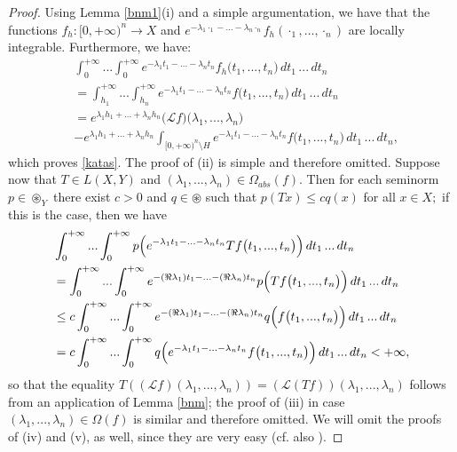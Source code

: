 \documentclass{amsart}
\theoremstyle{definition}
\theoremstyle{remark}
\numberwithin{equation}{section}
\begin{document}
\begin{proof}
Using Lemma \ref{bnm1}(i) and a simple argumentation, we have that the functions $f_{h} : [0,+\infty)^{n}\rightarrow X$ and $e^{-\lambda_{1}\cdot_{1}-...-\lambda_{n}\cdot_{n}}f_{h}(\cdot_{1},...,\cdot_{n})$ are locally integrable. Furthermore, we have:
\begin{align*} &
\int^{+\infty}_{0}...\int^{+\infty}_{0}e^{-\lambda_{1}t_{1}-...-\lambda_{n}t_{n}}f_{h}\bigl(t_{1},...,t_{n}\bigr)\, dt_{1}\, ...\, dt_{n}
\\&=\int^{+\infty}_{h_{1}}...\int^{+\infty}_{h_{n}}e^{-\lambda_{1}t_{1}-...-\lambda_{n}t_{n}}f\bigl(t_{1},...,t_{n}\bigr)\, dt_{1}\, ...\, dt_{n}
\\& =e^{\lambda_{1}h_{1}+...+\lambda_{n}h_{n}}\bigl({\mathcal Lf}\bigr)\bigl(\lambda_{1},...,\lambda_{n}\bigr)\\&-e^{\lambda_{1}h_{1}+...+\lambda_{n}h_{n}}\int_{[0,+\infty)^{n}\setminus H}e^{-\lambda_{1}t_{1}-...-\lambda_{n}t_{n}}f\bigl(t_{1},...,t_{n}\bigr)\, dt_{1}\, ...\, dt_{n},
\end{align*}
which proves \eqref{katas}. The proof of (ii) is simple and therefore omitted. Suppose now that $T\in L(X,Y)$ and $(\lambda_{1},...,\lambda_{n})\in \Omega_{abs}(f)$. Then for each seminorm $p\in \circledast_{Y}$ there exist $c>0$ and $q\in \circledast$ such that $p(Tx)\leq cq(x)$ for all $x\in X;$ if this is the case, then we have
\begin{align*} &
\int^{+\infty}_{0}...\int^{+\infty}_{0}p\Bigl(e^{-\lambda_{1}t_{1}-...-\lambda_{n}t_{n}}Tf\bigl(t_{1},...,t_{n}\bigr)\Bigr)\, dt_{1}\, ...\, dt_{n}
\\& =\int^{+\infty}_{0}...\int^{+\infty}_{0}e^{-(\Re \lambda_{1})t_{1}-...-(\Re\lambda_{n})t_{n}}p\Bigl( Tf\bigl(t_{1},...,t_{n}\bigr)\Bigr)\, dt_{1}\, ...\, dt_{n}
\\& \leq c\int^{+\infty}_{0}...\int^{+\infty}_{0}e^{-(\Re \lambda_{1})t_{1}-...-(\Re\lambda_{n})t_{n}}q\Bigl( f\bigl(t_{1},...,t_{n}\bigr)\Bigr)\, dt_{1}\, ...\, dt_{n}
\\& =c \int^{+\infty}_{0}...\int^{+\infty}_{0}q\Bigl(e^{-\lambda_{1}t_{1}-...-\lambda_{n}t_{n}}f\bigl(t_{1},...,t_{n}\bigr)\Bigr)\, dt_{1}\, ...\, dt_{n}<+\infty,
\end{align*}
so that the equality $T(({\mathcal Lf})(\lambda_{1},...,\lambda_{n}))=({\mathcal L(Tf)})(\lambda_{1},...,\lambda_{n})$ follows from an application of Lemma \ref{bnm}; the proof of (iii) in case $(\lambda_{1},...,\lambda_{n})\in \Omega(f)$ is similar and therefore omitted. We will omit the proofs of (iv) and (v), as well, since they are very easy (cf. also \cite[Theorem 1.2.3, Theorem 1.4.2(iv)]{FKP}).
\end{proof}
 
\end{document}
